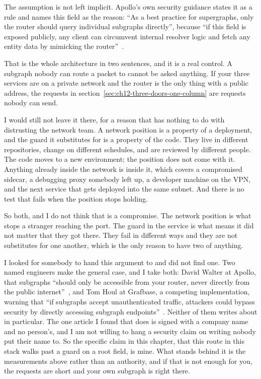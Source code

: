 %
The assumption is not left implicit. Apollo's own security guidance states it
as a rule and names this field as the reason:
\enquote{As a best practice for supergraphs, only the router should query
individual subgraphs directly}, because \enquote{if this field is exposed
publicly, any client can circumvent internal resolver logic and fetch any
entity data by mimicking the router}~\autocite{apollographsecurity}.

%
That is the whole architecture in two sentences, and it is a real control. A
subgraph nobody can route a packet to cannot be asked anything. If your three
services are on a private network and the router is the only thing with a
public address, the requests in
section~\ref{sec:ch12-three-doors-one-column} are requests nobody can send.

%
I would still not leave it there, for a reason that has nothing to do with
distrusting the network team. A network position is a property of a
deployment, and the guard it substitutes for is a property of the code. They
live in different repositories, change on different schedules, and are
reviewed by different people. The code moves to a new environment; the
position does not come with it. Anything already inside the network is inside
it, which covers a compromised sidecar, a debugging proxy somebody left up, a
developer machine on the VPN, and the next service that gets deployed into
the same subnet. And there is no test that fails when the position stops
holding.

%
So both, and I do not think that is a compromise. The network position is
what stops a stranger reaching the port. The guard in the service is what
means it did not matter that they got there. They fail in different ways and
they are not substitutes for one another, which is the only reason to have
two of anything.

%
I looked for somebody to hand this argument to and did not find one. Two
named engineers make the general case, and I take both: David Walter at
Apollo, that subgraphs \enquote{should only be accessible from your router,
never directly from the public internet}~\autocite{walter2026subgraphs}, and
Tom Houl at Grafbase, a competing implementation, warning that
\enquote{if subgraphs accept unauthenticated traffic, attackers could bypass
security by directly accessing subgraph
endpoints}~\autocite{houle2026federation}. Neither
of them writes about  in particular. The one article I found
that does is signed with a company name and no person's, and I am not willing
to hang a security claim on writing nobody put their name to. So the specific
claim in this chapter, that this route in this stack walks past a guard on a
root field, is mine. What stands behind it is the measurements above rather
than an authority, and if that is not enough for you, the requests are short
and your own subgraph is right there.

